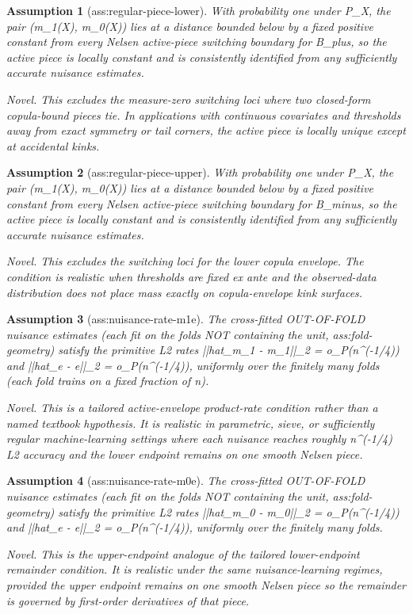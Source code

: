 \documentclass{article}
\newtheorem{assumption}{Assumption}
\begin{document}
\begin{assumption}[ass:regular-piece-lower]\label{ass:regular-piece-lower}
With probability one under P_X, the pair (m_1(X), m_0(X)) lies at a distance bounded below by a fixed positive constant from every Nelsen active-piece switching boundary for B_plus, so the active piece is locally constant and is consistently identified from any sufficiently accurate nuisance estimates.
\par\smallskip\noindent\emph{Novel.} This excludes the measure-zero switching loci where two closed-form copula-bound pieces tie. In applications with continuous covariates and thresholds away from exact symmetry or tail corners, the active piece is locally unique except at accidental kinks.
\end{assumption}

\begin{assumption}[ass:regular-piece-upper]\label{ass:regular-piece-upper}
With probability one under P_X, the pair (m_1(X), m_0(X)) lies at a distance bounded below by a fixed positive constant from every Nelsen active-piece switching boundary for B_minus, so the active piece is locally constant and is consistently identified from any sufficiently accurate nuisance estimates.
\par\smallskip\noindent\emph{Novel.} This excludes the switching loci for the lower copula envelope. The condition is realistic when thresholds are fixed ex ante and the observed-data distribution does not place mass exactly on copula-envelope kink surfaces.
\end{assumption}

\begin{assumption}[ass:nuisance-rate-m1e]\label{ass:nuisance-rate-m1e}
The cross-fitted OUT-OF-FOLD nuisance estimates (each fit on the folds NOT containing the unit, ass:fold-geometry) satisfy the primitive L2 rates ||hat_m_1 - m_1||_2 = o_P(n^(-1/4)) and ||hat_e - e||_2 = o_P(n^(-1/4)), uniformly over the finitely many folds (each fold trains on a fixed fraction of n).
\par\smallskip\noindent\emph{Novel.} This is a tailored active-envelope product-rate condition rather than a named textbook hypothesis. It is realistic in parametric, sieve, or sufficiently regular machine-learning settings where each nuisance reaches roughly n^(-1/4) L2 accuracy and the lower endpoint remains on one smooth Nelsen piece.
\end{assumption}

\begin{assumption}[ass:nuisance-rate-m0e]\label{ass:nuisance-rate-m0e}
The cross-fitted OUT-OF-FOLD nuisance estimates (each fit on the folds NOT containing the unit, ass:fold-geometry) satisfy the primitive L2 rates ||hat_m_0 - m_0||_2 = o_P(n^(-1/4)) and ||hat_e - e||_2 = o_P(n^(-1/4)), uniformly over the finitely many folds.
\par\smallskip\noindent\emph{Novel.} This is the upper-endpoint analogue of the tailored lower-endpoint remainder condition. It is realistic under the same nuisance-learning regimes, provided the upper endpoint remains on one smooth Nelsen piece so the remainder is governed by first-order derivatives of that piece.
\end{assumption}
\end{document}

